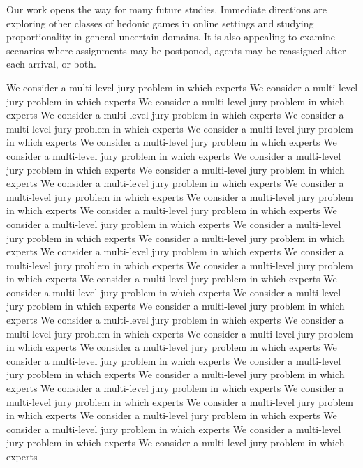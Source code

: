 \documentclass[letterpaper]{article} %
\begin{document}
Our work opens the way for many future studies. Immediate directions are exploring other classes of hedonic games in online settings and studying proportionality in general uncertain domains. It is also appealing to examine scenarios where assignments may be postponed, agents may be reassigned after each arrival, or both.


We consider a multi-level jury problem in which experts
We consider a multi-level jury problem in which experts
We consider a multi-level jury problem in which experts
We consider a multi-level jury problem in which experts
We consider a multi-level jury problem in which experts
We consider a multi-level jury problem in which experts
We consider a multi-level jury problem in which experts
We consider a multi-level jury problem in which experts
We consider a multi-level jury problem in which experts
We consider a multi-level jury problem in which experts
We consider a multi-level jury problem in which experts
We consider a multi-level jury problem in which experts
We consider a multi-level jury problem in which experts
We consider a multi-level jury problem in which experts
We consider a multi-level jury problem in which experts
We consider a multi-level jury problem in which experts
We consider a multi-level jury problem in which experts
We consider a multi-level jury problem in which experts
We consider a multi-level jury problem in which experts
We consider a multi-level jury problem in which experts
We consider a multi-level jury problem in which experts
We consider a multi-level jury problem in which experts
We consider a multi-level jury problem in which experts
We consider a multi-level jury problem in which experts
We consider a multi-level jury problem in which experts
We consider a multi-level jury problem in which experts
We consider a multi-level jury problem in which experts
We consider a multi-level jury problem in which experts
We consider a multi-level jury problem in which experts
We consider a multi-level jury problem in which experts
We consider a multi-level jury problem in which experts
We consider a multi-level jury problem in which experts
We consider a multi-level jury problem in which experts
We consider a multi-level jury problem in which experts
We consider a multi-level jury problem in which experts
We consider a multi-level jury problem in which experts
We consider a multi-level jury problem in which experts
We consider a multi-level jury problem in which experts
\clearpage

\end{document}
